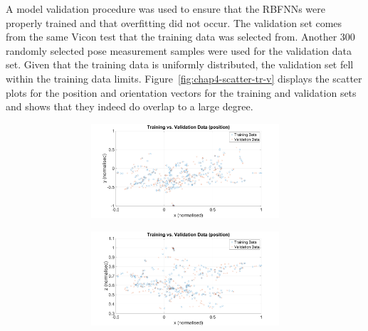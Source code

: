 A model validation procedure was used to ensure that the RBFNNs were properly trained and that overfitting did not occur. The validation set comes from the same Vicon test that the training data was selected from. Another 300 randomly selected pose measurement samples were used for the validation data set. Given that the training data is uniformly distributed, the validation set fell within the training data limits. Figure~\ref{fig:chap4-scatter-tr-v} displays the scatter plots for the position and orientation vectors for the training and validation sets and shows that they indeed do overlap to a large degree. 

\begin{figure}
  \centering
  \begin{subfigure}{\textwidth}
    \begin{subfigure}{0.48\textwidth}
      \includegraphics[clip, trim = 80 0 80 0, width=\textwidth]{figures/chapter4/tr_v_v_xy}
    \end{subfigure}
    \begin{subfigure}{0.48\textwidth}
      \includegraphics[clip, trim = 80 0 80 0, width=\textwidth]{figures/chapter4/tr_v_v_xz}
    \end{subfigure}
    \caption{}
  \end{subfigure}

\end{figure}

